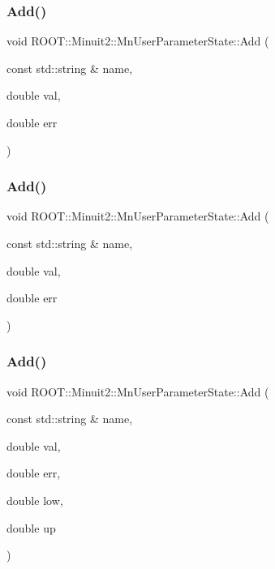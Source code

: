 \subsubsection{\texorpdfstring{Add()}{Add()}\hspace{0.1cm}{\footnotesize\ttfamily [2/9]}}
{\footnotesize\ttfamily void R\+O\+O\+T\+::\+Minuit2\+::\+Mn\+User\+Parameter\+State\+::\+Add (\begin{DoxyParamCaption}\item[{const std\+::string \&}]{name,  }\item[{double}]{val,  }\item[{double}]{err }\end{DoxyParamCaption})}

\mbox{\label{classROOT_1_1Minuit2_1_1MnUserParameterState_a958abf8c6542ba9be16e298ad2b63001}} 
\subsubsection{\texorpdfstring{Add()}{Add()}\hspace{0.1cm}{\footnotesize\ttfamily [3/9]}}
{\footnotesize\ttfamily void R\+O\+O\+T\+::\+Minuit2\+::\+Mn\+User\+Parameter\+State\+::\+Add (\begin{DoxyParamCaption}\item[{const std\+::string \&}]{name,  }\item[{double}]{val,  }\item[{double}]{err }\end{DoxyParamCaption})}

\mbox{\label{classROOT_1_1Minuit2_1_1MnUserParameterState_a3cdf26ae6585812a59b84dd72d7aac51}} 
\subsubsection{\texorpdfstring{Add()}{Add()}\hspace{0.1cm}{\footnotesize\ttfamily [4/9]}}
{\footnotesize\ttfamily void R\+O\+O\+T\+::\+Minuit2\+::\+Mn\+User\+Parameter\+State\+::\+Add (\begin{DoxyParamCaption}\item[{const std\+::string \&}]{name,  }\item[{double}]{val,  }\item[{double}]{err,  }\item[{double}]{low,  }\item[{double}]{up }\end{DoxyParamCaption})}

